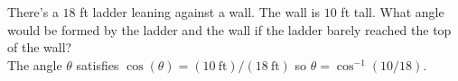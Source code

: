 There's a $18$ ft ladder leaning against a wall. The wall is $10$ ft tall. What angle would be formed by the ladder and the wall if the ladder barely reached the top of the wall?
\[\]
The angle $\theta$ satisfies $\cos(\theta) = (10\ \text{ft}) / (18\ \text{ft})$ so $\theta = \cos^{-1}(10 / 18)$.
